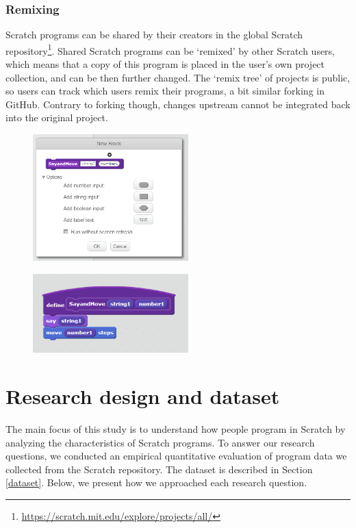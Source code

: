 \documentclass{sig-alternate}
\begin{document}
\subsubsection{Remixing}
Scratch programs can be shared by their creators in the global Scratch repository\footnote{\url{https://scratch.mit.edu/explore/projects/all/}}. Shared Scratch programs can be `remixed' by other Scratch users, which means that a copy of this program is placed in the user's own project collection, and can be then further changed. The `remix tree' of projects is public, so users can track which users remix their programs, a bit similar forking in GitHub. Contrary to forking though, changes upstream cannot be integrated back into the original project.

\begin{figure}
	\begin{center}
		\includegraphics[width=6cm]{fig/makeBlockSmall.png}
		\caption{}
		\label{fig:makeBlock}
	\end{center}
\end{figure} 

\begin{figure}
	\begin{center}
		\includegraphics[width=6cm]{fig/useBlockSmall.png}
		\caption{}
		\label{fig:useBlock}
	\end{center}
\end{figure} 


\section{Research design and dataset}
\label{researchDesign}

The main focus of this study is to understand how people program in Scratch by analyzing the characteristics of Scratch programs. To answer our research questions, we conducted an empirical quantitative evaluation of program data we collected from the Scratch repository. The dataset is described in Section \ref{dataset}. Below, we present how we approached each research question.
\end{document}
